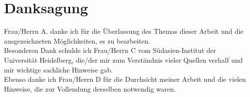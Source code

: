 \section{Danksagung}
\vspace*{1em}

Frau/Herrn A. danke ich für die Überlassung des Themas dieser Arbeit und 
die ausgezeichneten Möglichkeiten, es zu bearbeiten.\\

Besonderen Dank schulde ich Frau/Herrn C vom Südasien-Institut der Universität Heidelberg, 
die/der mir zum Verständnis vieler Quellen verhalf und mir wichtige sachliche Hinweise gab.\\

Ebenso danke ich Frau/Herrn D für die Durchsicht meiner Arbeit und die vielen Hinweise,
die zur Vollendung derselben notwendig waren.
    